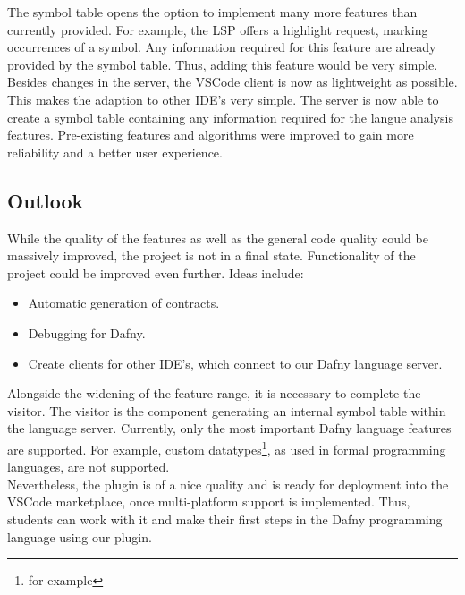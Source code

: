 The symbol table opens the option to implement many more features than currently provided.
For example, the LSP offers a highlight request, marking occurrences of a symbol.
Any information required for this feature are already provided by the symbol table.
Thus, adding this feature would be very simple.\\

Besides changes in the server, the VSCode client is now as lightweight as possible.
This makes the adaption to other IDE's very simple.
The server is now able to create a symbol table containing any information required for the langue analysis features.
Pre-existing features and algorithms were improved to gain more reliability and a better user experience.

\pagebreak

\subsection{Outlook}
While the quality of the features as well as the general code quality could be massively improved, the project is not in a final state.
Functionality of the project could be improved even further.
Ideas include:
\begin{itemize}
    \item Automatic generation of contracts.
    \item Debugging for Dafny.
    \item Create clients for other IDE's, which connect to our Dafny language server.
\end{itemize}

Alongside the widening of the feature range, it is necessary to complete the visitor.
The visitor is the component generating an internal symbol table within the language server.
Currently, only the most important Dafny language features are supported.
For example, custom datatypes\footnote{for example }, as used in formal programming languages, are not supported.\\

Nevertheless, the plugin is of a nice quality and is ready for deployment into the VSCode marketplace, once multi-platform support is implemented.
Thus, students can work with it and make their first steps in the Dafny programming language using our plugin.
